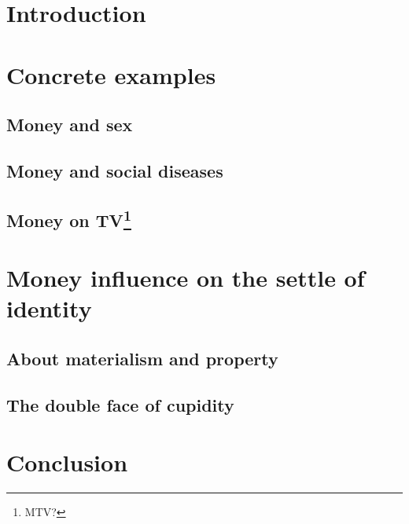 \section{Introduction}



\section{Concrete examples}

\subsection{Money and sex}



\subsection{Money and social diseases}



\subsection[Money on TV]{Money on TV\footnote{MTV?}}



\section{Money influence on the settle of identity}

\subsection{About materialism and property}



\subsection{The double face of cupidity}



\section{Conclusion}



